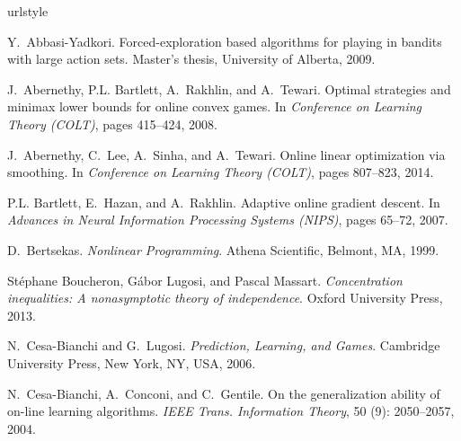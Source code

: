 \documentclass[english]{article}
\begin{document}
\begin{thebibliography}{30}
\providecommand{\natexlab}[1]{#1}
\providecommand{\url}[1]{\texttt{#1}}
\expandafter\ifx\csname urlstyle\endcsname\relax
  \providecommand{\doi}[1]{doi: #1}\else
  \providecommand{\doi}{doi: \begingroup \urlstyle{rm}\Url}\fi

Y.~Abbasi-Yadkori.
\newblock Forced-exploration based algorithms for playing in bandits with large
  action sets.
\newblock Master's thesis, University of Alberta, 2009.

J.~Abernethy, P.L. Bartlett, A.~Rakhlin, and A.~Tewari.
\newblock Optimal strategies and minimax lower bounds for online convex games.
\newblock In \emph{Conference on Learning Theory (COLT)}, pages 415--424, 2008.

J.~Abernethy, C.~Lee, A.~Sinha, and A.~Tewari.
\newblock Online linear optimization via smoothing.
\newblock In \emph{Conference on Learning Theory (COLT)}, pages
  807--823, 2014.

P.L. Bartlett, E.~Hazan, and A.~Rakhlin.
\newblock Adaptive online gradient descent.
\newblock In \emph{Advances in Neural Information Processing Systems (NIPS)},
  pages 65--72, 2007.

D.~Bertsekas.
\newblock \emph{Nonlinear Programming}.
\newblock Athena Scientific, Belmont, MA, 1999.

St\'ephane Boucheron, G\'abor Lugosi, and Pascal Massart.
\newblock \emph{Concentration inequalities: A nonasymptotic theory of
  independence}.
\newblock Oxford University Press, 2013.

N.~Cesa-Bianchi and G.~Lugosi.
\newblock \emph{Prediction, Learning, and Games}.
\newblock Cambridge University Press, New York, NY, USA, 2006.

N.~Cesa{-}Bianchi, A.~Conconi, and C.~Gentile.
\newblock On the generalization ability of on-line learning algorithms.
\newblock \emph{{IEEE} Trans. Information Theory}, 50 (9):
  2050--2057, 2004.


\end{thebibliography}
\end{document}
